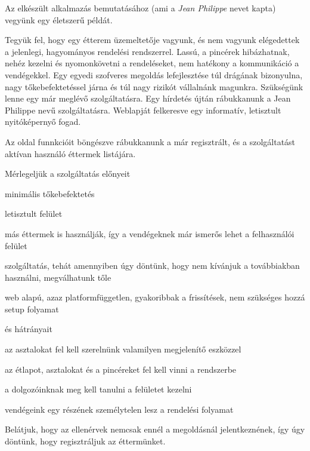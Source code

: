 Az elkészült alkalmazás bemutatásához (ami a \emph{Jean Philippe} nevet kapta) vegyünk egy életszerű példát. \par

Tegyük fel, hogy egy étterem üzemeltetője vagyunk, és nem vagyunk elégedettek a jelenlegi, hagyományos rendelési rendszerrel. Lassú, a pincérek hibázhatnak, nehéz kezelni és nyomonkövetni a rendeléseket, nem hatékony a kommunikáció a vendégekkel. Egy egyedi szofveres megoldás lefejlesztése túl drágának bizonyulna, nagy tőkebefektetéssel járna és túl nagy rizikót vállalnánk magunkra. Szükségünk lenne egy már meglévő szolgáltatásra. Egy hírdetés újtán rábukkanunk a Jean Philippe nevű szolgáltatásra. Weblapját felkeresve egy informatív, letisztult nyitóképernyő fogad. 


Az oldal funnkcióit böngészve rábukkanunk a már regisztrált, és a szolgáltatást aktívan használó éttermek listájára.


Mérlegeljük a szolgáltatás előnyeit

\begin{listing}
	\item minimális tőkebefektetés
	\item letisztult felület
	\item más éttermek is használják, így a vendégeknek már ismerős lehet a felhasználói felület
	\item szolgáltatás, tehát amennyiben úgy döntünk, hogy nem kívánjuk a továbbiakban használni, megválhatunk tőle
	\item web alapú, azaz platformfüggetlen, gyakoribbak a frissítések, nem szükséges hozzá setup folyamat
\end{listing}

és hátrányait

\begin{listing}
	\item az asztalokat fel kell szerelnünk valamilyen megjelenítő eszközzel
	\item az étlapot, asztalokat és a pincéreket fel kell vinni a rendszerbe
	\item a dolgozóinknak meg kell tanulni a felületet kezelni
	\item vendégeink egy részének személytelen lesz a rendelési folyamat
\end{listing}

Belátjuk, hogy az ellenérvek nemcsak ennél a megoldásnál jelentkeznének, így úgy döntünk, hogy regisztráljuk az éttermünket.

